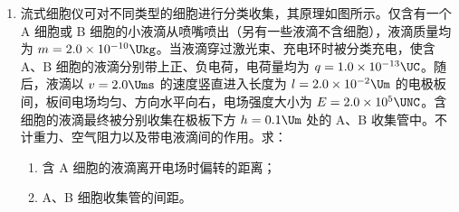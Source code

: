 \documentclass[\gkver]{gaokaozhenti}
\begin{document}
\begin{enumerate}
{故选择正确且正确排序为④①⑥⑤这四步。

（2）根据题意可知纸带上相邻计数点时间间隔 $T = \frac{1}{f} = 0.02 \Us$

根据匀变速直线运动中间时刻瞬时速度等于该过程平均速度可得 $v_{B} = \frac{h_{AC}}{2T}$

代入数据可得 $v_{B} \approx 1.79 \Ums$

（3）根据 $mgh = \frac{1}{2}mv^{2}$

整理可得 $v^{2} = 2g \cdot h$

可知理论上，若机械能守恒，图中直线应通过原点，且斜率 $k = 2g$

由图 3 得直线的斜率 $k = \frac{5.6 - 1.5}{0.295 - 0.08} \approx 19.1$

（4）根据题意有 $\eta = \frac{mgh - \frac{1}{2}mv^{2}}{mgh} \times 100\%$

可得 $\eta = \frac{2g - k}{2g} \times 100\%$

当地重力加速度大小取 $g = 9.80 \Umsq$，用第（3）问的斜率 $k=19.1\Umsq$ 代入，得 $\eta=\frac{19.6-19.1}{19.6}\times100\%\approx2.6\%$。
}

\item
流式细胞仪可对不同类型的细胞进行分类收集，其原理如图所示。仅含有一个 A 细胞或 B 细胞的小液滴从喷嘴喷出（另有一些液滴不含细胞），液滴质量均为 $m = 2.0 \times 10^{-10} \Ukg$。当液滴穿过激光束、充电环时被分类充电，使含 A、B 细胞的液滴分别带上正、负电荷，电荷量均为 $q = 1.0 \times 10^{-13} \UC$。随后，液滴以 $v = 2.0 \Ums$ 的速度竖直进入长度为 $l = 2.0 \times 10^{-2} \Um$ 的电极板间，板间电场均匀、方向水平向右，电场强度大小为 $E = 2.0 \times 10^{5} \UNC$。含细胞的液滴最终被分别收集在极板下方 $h = 0.1 \Um$ 处的 A、B 收集管中。不计重力、空气阻力以及带电液滴间的作用。求：

\begin{enumerate}
	\item
	含 A 细胞的液滴离开电场时偏转的距离；
	\item
	A、B 细胞收集管的间距。
\end{enumerate}


\end{enumerate}
\end{document}
